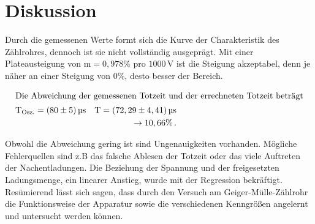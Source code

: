 \section{Diskussion}

\begin{flushleft}
    Durch die gemessenen Werte formt sich die Kurve der Charakteristik des Zählrohres, dennoch ist sie nicht vollständig ausgeprägt.
    Mit einer Plateausteigung von $\text{m} = 0,978\%$ pro $1000\,\unit{\volt}$ ist die Steigung akzeptabel, denn je näher an einer Steigung von $0\%$, desto besser der Bereich.
\end{flushleft}

\begin{align*}
    \intertext{Die Abweichung der gemessenen Totzeit und der errechneten Totzeit beträgt}
    \text{T}_{\text{Osz.}} = (80 \pm 5)\,\unit{\micro\second} \,\,\,\,\,\, \text{T} = (72,29 \pm 4,41)\,\unit{\micro\second} \\
    \to 10,66\%\,.
\end{align*}

\begin{flushleft}
    Obwohl die Abweichung gering ist sind Ungenauigkeiten vorhanden.
    Mögliche Fehlerquellen sind z.B das falsche Ablesen der Totzeit oder das viele Auftreten der Nachentladungen. 
    Die Beziehung der Spannung und der freigesetzten Ladungsmenge, ein linearer Anstieg, wurde mit der Regression bekräftigt.
    Resümierend lässt sich sagen, dass durch den Versuch am Geiger-Mülle-Zählrohr die Funktionsweise der Apparatur sowie die verschiedenen Kenngrößen angelernt und untersucht werden können.
\end{flushleft}